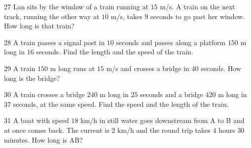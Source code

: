\gap
\begin{probbox}{27}{\relax}
Lan sits by the window of a train running at $15$ m/s. A train on the next track, running the other way at $10$ m/s, takes $9$ seconds to go past her window. How long is that train?
\end{probbox}
\gap
\begin{probbox}{28}{\relax}
A train passes a signal post in $10$ seconds and passes along a platform $150$ m long in $16$ seconds. Find the length and the speed of the train.
\end{probbox}
\gap
\begin{probbox}{29}{\relax}
A train $150$ m long runs at $15$ m/s and crosses a bridge in $40$ seconds. How long is the bridge?
\end{probbox}
\gap
\begin{probbox}{30}{\relax}
A train crosses a bridge $240$ m long in $25$ seconds and a bridge $420$ m long in $37$ seconds, at the same speed. Find the speed and the length of the train.
\end{probbox}
\begin{probbox}{31}{}
A boat with speed $18$ km/h in still water goes downstream from A to B and at once comes back. The current is $2$ km/h and the round trip takes $4$ hours $30$ minutes. How long is AB?
\end{probbox}
